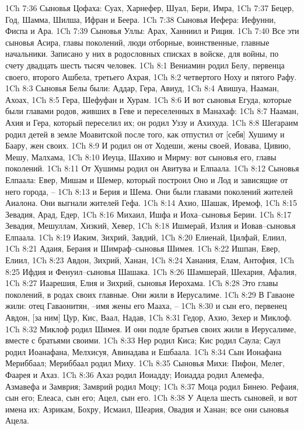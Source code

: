 1Ch 7:36  Сыновья Цофаха: Суах, Харнефер, Шуал, Бери, Имра,
1Ch 7:37  Бецер, Год, Шамма, Шилша, Ифран и Беера.
1Ch 7:38  Сыновья Иефера: Иефунни, Фиспа и Ара.
1Ch 7:39  Сыновья Уллы: Арах, Ханниил и Риция.
1Ch 7:40  Все эти сыновья Асира, главы поколений, люди отборные, воинственные, главные начальники. Записано у них в родословных списках в войске, для войны, по счету двадцать шесть тысяч человек.
1Ch 8:1  Вениамин родил Белу, первенца своего, второго Ашбела, третьего Ахрая,
1Ch 8:2  четвертого Ноху и пятого Рафу.
1Ch 8:3  Сыновья Белы были: Аддар, Гера, Авиуд,
1Ch 8:4  Авишуа, Нааман, Ахоах,
1Ch 8:5  Гера, Шефуфан и Хурам.
1Ch 8:6  И вот сыновья Егуда, которые были главами родов, живших в Геве и переселенных в Манахаф:
1Ch 8:7  Нааман, Ахия и Гера, который переселил их; он родил Уззу и Ахихуда.
1Ch 8:8  Шегараим родил детей в земле Моавитской после того, как отпустил от [себя] Хушиму и Баару, жен своих.
1Ch 8:9  И родил он от Ходеши, жены своей, Иовава, Цивию, Мешу, Малхама,
1Ch 8:10  Иеуца, Шахию и Мирму: вот сыновья его, главы поколений.
1Ch 8:11  От Хушимы родил он Авитува и Елпаала.
1Ch 8:12  Сыновья Елпаала: Евер, Мишам и Шемер, который построил Оно и Лод и зависящие от него города, --
1Ch 8:13  и Берия и Шема. Они были главами поколений жителей Аиалона. Они выгнали жителей Гефа.
1Ch 8:14  Ахио, Шашак, Иремоф,
1Ch 8:15  Зевадия, Арад, Едер,
1Ch 8:16  Михаил, Ишфа и Иоха--сыновья Берии.
1Ch 8:17  Зевадия, Мешуллам, Хизкий, Хевер,
1Ch 8:18  Ишмерай, Излия и Иовав--сыновья Елпаала.
1Ch 8:19  Иаким, Зихрий, Завдий,
1Ch 8:20  Елиенай, Цилфай, Елиил,
1Ch 8:21  Адаия, Бераия и Шимраф--сыновья Шимея.
1Ch 8:22  Ишпан, Евер, Елиил,
1Ch 8:23  Авдон, Зихрий, Ханан,
1Ch 8:24  Ханания, Елам, Антофия,
1Ch 8:25  Ифдия и Фенуил--сыновья Шашака.
1Ch 8:26  Шамшерай, Шехария, Афалия,
1Ch 8:27  Иаарешия, Елия и Зихрий, сыновья Иерохама.
1Ch 8:28  Это главы поколений, в родах своих главные. Они жили в Иерусалиме.
1Ch 8:29  В Гаваоне жили: отец Гаваонитян, --имя жены его Мааха, --
1Ch 8:30  и сын его, первенец Авдон, [за ним] Цур, Кис, Ваал, Надав,
1Ch 8:31  Гедор, Ахио, Зехер и Миклоф.
1Ch 8:32  Миклоф родил Шимея. И они подле братьев своих жили в Иерусалиме, вместе с братьями своими.
1Ch 8:33  Нер родил Киса; Кис родил Саула; Саул родил Иоанафана, Мелхисуя, Авинадава и Ешбаала.
1Ch 8:34  Сын Ионафана Мериббаал; Мериббаал родил Миху.
1Ch 8:35  Сыновья Михи: Пифон, Мелег, Фаарея и Ахаз.
1Ch 8:36  Ахаз родил Иоиадду; Иоиадда родил Алемефа, Азмавефа и Замврия; Замврий родил Моцу;
1Ch 8:37  Моца родил Бинею. Рефаия, сын его; Елеаса, сын его; Ацел, сын его.
1Ch 8:38  У Ацела шесть сыновей, и вот имена их: Азрикам, Бохру, Исмаил, Шеария, Овадия и Ханан; все они сыновья Ацела.
